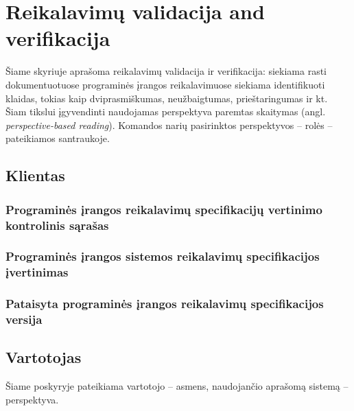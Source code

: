 \documentclass{VUMIFPSkursinis}
\begin{document}
\section{Reikalavimų validacija and verifikacija}

Šiame skyriuje aprašoma reikalavimų validacija ir verifikacija: siekiama rasti dokumentuotuose programinės įrangos
reikalavimuose siekiama identifikuoti klaidas, tokias kaip dviprasmiškumas, neužbaigtumas, prieštaringumas ir kt.
Šiam tikslui įgyvendinti naudojamas perspektyva paremtas skaitymas (angl. \textit{perspective-based reading}). Komandos narių
pasirinktos perspektyvos -- rolės -- pateikiamos santraukoje.

\subsection{Klientas}

\subsubsection{Programinės įrangos reikalavimų specifikacijų vertinimo kontrolinis sąrašas}

\subsubsection{Programinės įrangos sistemos reikalavimų specifikacijos įvertinimas}

\subsubsection{Pataisyta programinės įrangos reikalavimų specifikacijos versija}

		\subsection{Vartotojas}
	Šiame poskyryje pateikiama vartotojo -- asmens, naudojančio aprašomą sistemą -- perspektyva.
\end{document}
